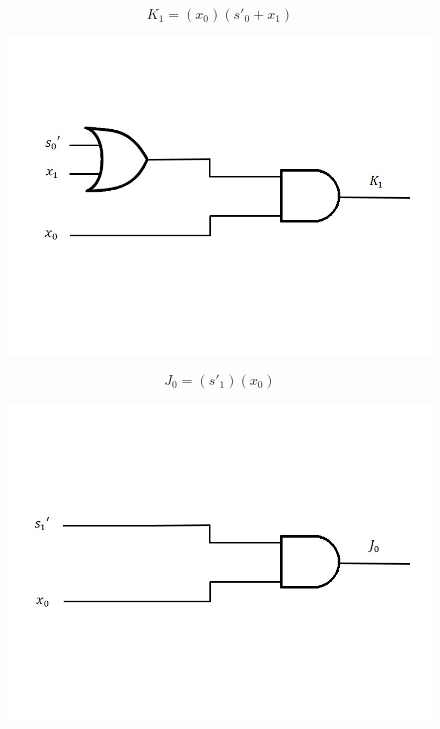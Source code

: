 \documentclass{article}
\begin{document}
\begin{equation*}
K_1 = (x_0)(s'_0 + x_1)
\end{equation*}
\begin{figure}[h!]
\centering
\includegraphics[scale=0.3]{K1}
\end{figure}

\begin{equation*}
J_0 = (s'_1)(x_0)
\end{equation*}
\begin{figure}[h!]
\centering
\includegraphics[scale=0.3]{J0}
\end{figure}

\clearpage
\end{document}
